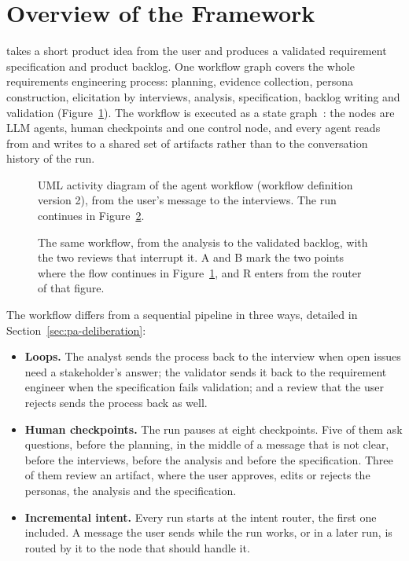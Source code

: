 \section{Overview of the Framework}
\label{sec:pa-overview}

\sysname{} takes a short product idea from the user and produces a validated requirement specification and product backlog. One workflow graph covers the whole requirements engineering process: planning, evidence collection, persona construction, elicitation by interviews, analysis, specification, backlog writing and validation (Figure~\ref{fig:pa-workflow}). The workflow is executed as a state graph~\cite{langgraph}: the nodes are LLM agents, human checkpoints and one control node, and every agent reads from and writes to a shared set of artifacts rather than to the conversation history of the run.

\begin{figure}[H]
    \centering
    \resizebox{\linewidth}{!}{}
    \caption{UML activity diagram of the agent workflow (workflow definition version 2), from the user's message to the interviews. The run continues in Figure~\ref{fig:pa-workflow-b}.}
    \label{fig:pa-workflow}
\end{figure}

\begin{figure}[H]
    \centering
    \resizebox{\linewidth}{!}{}
    \caption{The same workflow, from the analysis to the validated backlog, with the two reviews that interrupt it. A and B mark the two points where the flow continues in Figure~\ref{fig:pa-workflow}, and R enters from the router of that figure.}
    \label{fig:pa-workflow-b}
\end{figure}

The workflow differs from a sequential pipeline in three ways, detailed in Section~\ref{sec:pa-deliberation}:
\begin{itemize}
    \item \textbf{Loops.} The analyst sends the process back to the interview when open issues need a stakeholder's answer; the validator sends it back to the requirement engineer when the specification fails validation; and a review that the user rejects sends the process back as well.
    \item \textbf{Human checkpoints.} The run pauses at eight checkpoints. Five of them ask questions, before the planning, in the middle of a message that is not clear, before the interviews, before the analysis and before the specification. Three of them review an artifact, where the user approves, edits or rejects the personas, the analysis and the specification.
    \item \textbf{Incremental intent.} Every run starts at the intent router, the first one included. A message the user sends while the run works, or in a later run, is routed by it to the node that should handle it.
\end{itemize}

